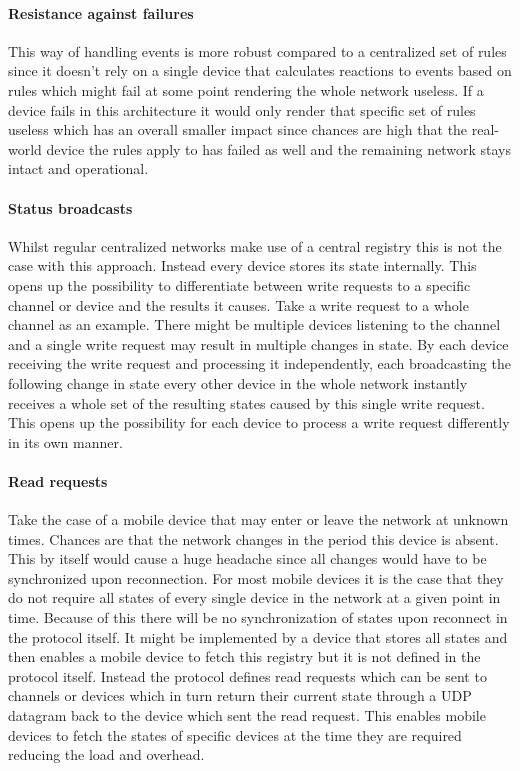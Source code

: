 \documentclass[a4paper]{article}
\begin{document}
	        \paragraph{Resistance against failures}
				This way of handling events is more robust compared to a centralized set of rules since it doesn't rely on a
				single device that calculates reactions to events based on rules which might fail at some point rendering
				the whole network useless. If a device fails in this architecture it would only render that specific set of
				rules useless which has an overall smaller impact since chances are high that the real-world device the
				rules apply to has failed as well and the remaining network stays intact and operational.
			\paragraph{Status broadcasts}
				Whilst regular centralized networks make use of a central registry this is not the case with this approach.
				Instead every device stores its state internally. This opens up the possibility to differentiate between
				write requests to a specific channel or device and the results it causes. Take a write request to a whole
				channel as an example. There might be multiple devices listening to the channel and a single write request
				may result in multiple changes in state. By each device receiving the write request and processing it
				independently, each broadcasting the following change in state every other device in the whole network
				instantly receives a whole set of the resulting states caused by this single write request.
				This opens up the possibility for each device to process a write request differently in its own manner.
			\paragraph{Read requests}
				Take the case of a mobile device that may enter or leave the network at unknown times. Chances are that
				the network changes in the period this device is absent. This by itself would cause a huge headache since
				all changes would have to be synchronized upon reconnection. For most mobile devices it is the case that
				they do not require all states of every single device in the network at a given point in time. Because of this
				there will be no synchronization of states upon reconnect in the protocol itself. It might be implemented
				by a device that stores all states and then enables a mobile device to fetch this registry but it is not
				defined in the protocol itself. Instead the protocol defines read requests which can be sent to channels
				or devices which in turn return their current state through a UDP datagram back to the device which
				sent the read request. This enables mobile devices to fetch the states of specific devices at the time
				they are required reducing the load and overhead.
\end{document}
